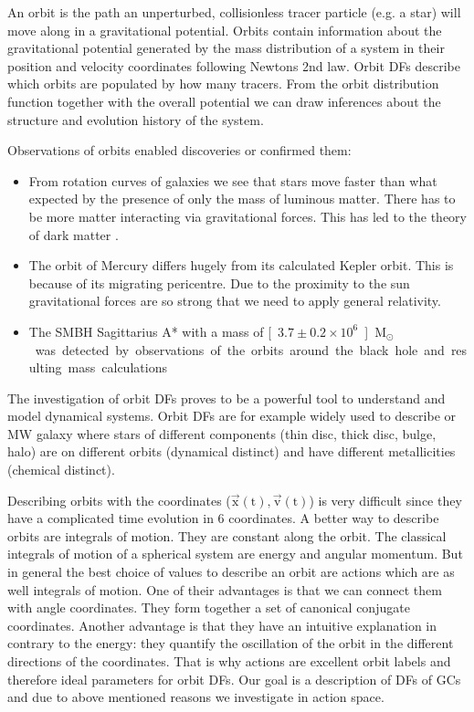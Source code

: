 \par An orbit is the path an unperturbed, collisionless tracer particle (e.g. a star) will move along in a gravitational potential. Orbits contain information about the gravitational potential generated by the mass distribution of a system in their position and velocity coordinates following Newtons 2nd law. Orbit \acp{DF} describe which orbits are populated by how many tracers. From the orbit distribution function together with the overall potential we can draw inferences about the structure and evolution history of the system. 
\par Observations of orbits enabled discoveries or confirmed them: 
\begin{itemize}
\item From rotation curves of galaxies we see that stars move faster than what expected by the presence of only the mass of luminous matter. There has to be more matter interacting via gravitational forces. This has led to the theory of dark matter \citep{1980ApJ...238..471R}.
\item The orbit of Mercury differs hugely from its calculated Kepler orbit. This is because of its migrating pericentre. Due to the proximity to the sun gravitational forces are so strong that we need to apply general relativity.
\item The \ac{SMBH} Sagittarius A*  with a mass of \unit[\(3.7\pm0.2\times 10^6\)]{M\(_\odot\)} was detected by observations of the orbits around the black hole and resulting mass calculations. \citep[p.928]{2006ima..book.....C} 
\end{itemize}
\par The investigation of orbit \acp{DF} proves to be a powerful tool to understand and model dynamical systems. Orbit \acp{DF} are for example widely used to describe or \ac{MW} galaxy where stars of different components (thin disc, thick disc, bulge, halo) are on different orbits (dynamical distinct) and have different metallicities (chemical distinct).
\\\par Describing orbits with the coordinates (\(\vec{\mathrm{x}}(\mathrm{t}),\vec{\mathrm{v}}(\mathrm{t})\)) is very difficult since they have a complicated time evolution in 6 coordinates. A better way to describe orbits are integrals of motion. They are constant along the orbit. The classical integrals of motion of a spherical system are energy and angular momentum. But in general the best choice of values to describe an orbit are actions which are as well integrals of motion. One of their advantages is that we can connect them with angle coordinates. They form together a set of canonical conjugate coordinates. Another advantage is that they have an intuitive explanation in contrary to the energy: they quantify the oscillation of the orbit in the different directions of the coordinates. That is why actions are excellent orbit labels and therefore ideal parameters for orbit \acp{DF}. Our goal is a description of \acp{DF} of \acp{GC} and due to above mentioned reasons we investigate in action space.
